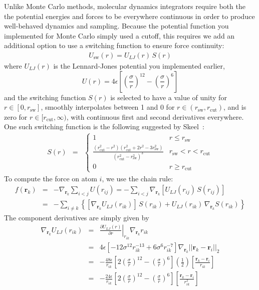 \documentclass[aip,jcp,preprint,superscriptaddress,floatfix]{revtex4-1}
\begin{document}
Unlike Monte Carlo methods, molecular dynamics integrators require both the the potential energies and forces to be everywhere continuous in order to produce well-behaved dynamics and sampling.
Because the potential function you implemented for Monte Carlo simply used a cutoff, this requires we add an additional option to use a switching function to ensure force continuity:
\begin{eqnarray}
U_\mathrm{sw}(r) = U_{LJ}(r) \, S(r)
\end{eqnarray}
where $U_{LJ}(r)$ is the Lennard-Jones potential you implemented earlier, 
\begin{equation}
U(r) = 4 \epsilon \left[\left(\frac{\sigma}{r}\right)^{12} -\left(\frac{\sigma}{r}\right)^{6} \right] 
\end{equation}
and the switching function $S(r)$ is selected to have a value of unity for $r \in [0, r_\mathrm{sw}]$, smoothly interpolates between 1 and 0 for $r \in (r_\mathrm{sw}, r_\mathrm{cut})$, and is zero for $r \in [r_\mathrm{cut}, \infty)$, with continuous first and second derivatives everywhere.
One such switching function is the following suggested by Skeel~\cite{Skeel.SIAMJSciComput.31.1363.2009}:
\begin{eqnarray}
S(r) &=& \begin{cases}
1 & r \le r_\mathrm{sw} \\
\frac{(r_\mathrm{cut}^2 - r^2) (r_\mathrm{cut}^2 + 2 r^2 - 3 r_\mathrm{sw}^2)}{(r_\mathrm{cut}^2 - r_\mathrm{sw}^2)^3} & r_\mathrm{sw} < r < r_\mathrm{cut} \\
0 & r \ge r_\mathrm{cut}
\end{cases}
\end{eqnarray}
To compute the force on atom $i$, we use the chain rule:
\begin{eqnarray}
f(\textbf{r}_k) &=& - \nabla_{\textbf{r}_k} \sum_{i < j} U(r_{ij}) =  - \sum_{i < j} \nabla_{\textbf{r}_k} \left[ U_{LJ}(r_{ij}) \, S(r_{ij}) \right] \nonumber \\
&=& - \sum_{i \ne k} \left\{ [ \nabla_{\textbf{r}_k} U_{LJ}(r_{ik}) ] \, S(r_{ik}) + U_{LJ}(r_{ik}) \,  \nabla_{\textbf{r}_k} S(r_{ik}) \right\}
\end{eqnarray}
The component derivatives are simply given by
\begin{eqnarray}
\nabla_{\mathbf{r}_k} U_{LJ}(r_{ik}) &=& \left. \frac{\partial U_{LJ}(r)}{\partial r} \right|_{r_{ik}} \nabla_{\mathbf{r}_k} r_{ik}  \\
&=& 4 \epsilon \left[- 12 \sigma^{12} r_{ik}^{-13} + 6 \sigma^6 r_{ik}^{-7} \right] \nabla_{\mathbf{r}_k} || \mathbf{r}_k - \mathbf{r}_i ||_2  \\
&=& - \frac{48 \epsilon}{r_{ik}} \left[2 \left(\frac{\sigma}{r}\right)^{12} - \left(\frac{\sigma}{r}\right)^{6} \right] \left( \frac{1}{2}\right) \left[ \frac{\mathbf{r}_k - \mathbf{r}_i}{r_{ik}} \right] \\
&=& - \frac{24 \epsilon}{r_{ik}} \left[2 \left(\frac{\sigma}{r}\right)^{12} - \left(\frac{\sigma}{r}\right)^{6} \right]  \left[ \frac{\mathbf{r}_k - \mathbf{r}_i}{r_{ik}^2} \right]  \\
\end{eqnarray}
\end{document}
